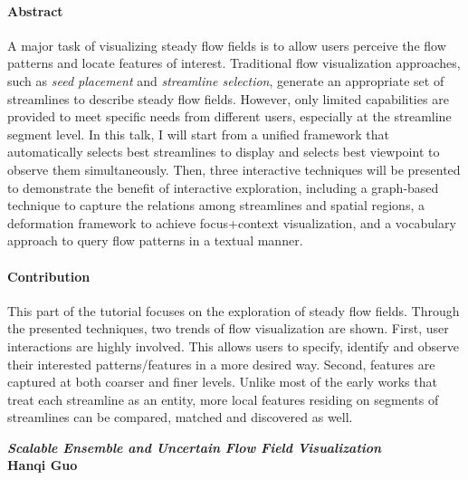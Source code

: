 \documentclass[preprint,journal]{vgtc}       %
\begin{document}
\paragraph{Abstract}
A major task of visualizing steady flow fields is to allow users perceive the flow patterns and locate features of interest. Traditional flow visualization approaches, such as \emph{seed placement} and \emph{streamline selection}, generate an appropriate set of streamlines to describe steady flow fields. However, only limited capabilities are provided to meet specific needs from different users, especially at the streamline segment level. In this talk, I will start from a unified framework that automatically selects best streamlines to display and selects best viewpoint to observe them simultaneously. Then, three interactive techniques will be presented to demonstrate the benefit of interactive exploration, including a graph-based technique to capture the relations among streamlines and spatial regions, a deformation framework to achieve focus+context visualization, and a vocabulary approach to query flow patterns in a textual manner.

\paragraph{Contribution}
This part of the tutorial focuses on the exploration of steady flow fields. Through the presented techniques, two trends of flow visualization are shown. First, user interactions are highly involved. This allows users to specify, identify and observe their interested patterns/features in a more desired way. Second, features are captured at both coarser and finer levels. Unlike most of the early works that treat each streamline as an entity, more local features residing on segments of streamlines can be compared, matched and discovered as well.


\noindent\textbf{\textit{Scalable Ensemble and Uncertain Flow Field Visualization}}\\
\textbf{Hanqi Guo}
\end{document}

